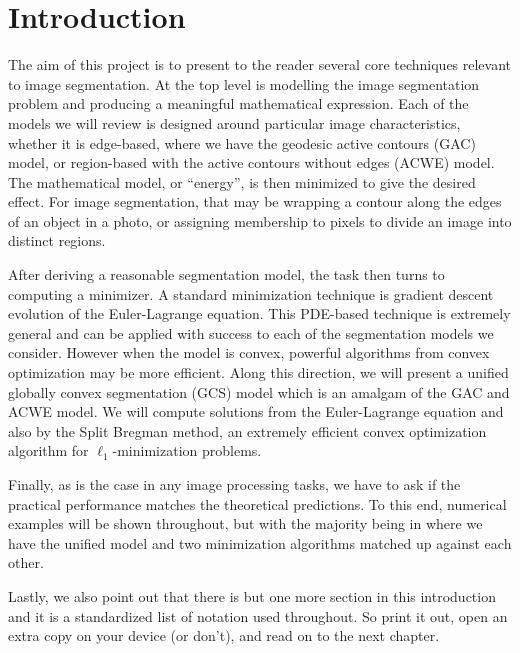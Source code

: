 \chapter{Introduction}
The aim of this project is to present to the reader several core techniques relevant to image segmentation. At the top level is modelling the image segmentation problem and producing a meaningful mathematical expression. Each of the models we will review is designed around particular image characteristics, whether it is edge-based, where we have the geodesic active contours (GAC) model, or region-based with the active contours without edges (ACWE) model. The mathematical model, or ``energy'', is then minimized to give the desired effect. For image segmentation, that may be wrapping a contour along the edges of an object in a photo, or assigning membership to pixels to divide an image into distinct regions. 

After deriving a reasonable segmentation model, the task then turns to computing a minimizer. A standard minimization technique is gradient descent evolution of the Euler-Lagrange equation. This PDE-based technique is extremely general and can be applied with success to each of the segmentation models we consider. However when the model is convex, powerful algorithms from convex optimization may be more efficient. Along this direction, we will present a unified globally convex segmentation (GCS) model which is an amalgam of the GAC and ACWE model. We will compute solutions from the Euler-Lagrange equation and also by the Split Bregman method, an extremely efficient convex optimization algorithm for $\ell_1$-minimization problems.

Finally, as is the case in any image processing tasks, we have to ask if the practical performance matches the theoretical predictions. To this end, numerical examples will be shown throughout, but with the majority being in  where we have the unified model and two minimization algorithms matched up against each other.


Lastly, we also point out that there is but one more section in this introduction and it is a standardized list of notation used throughout. So print it out, open an extra copy on your device (or don't), and read on to the next chapter. 

\newpage
